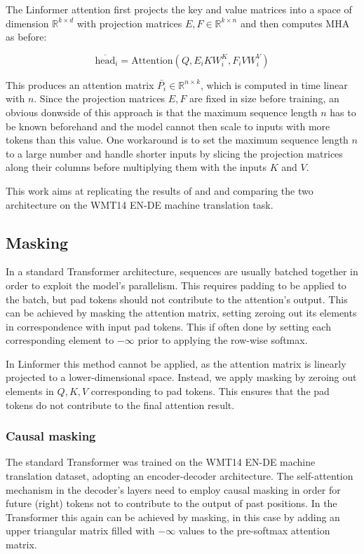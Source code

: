 \documentclass[titlepage]{article}
\begin{document}
The Linformer attention first projects the key and value matrices into a
space of dimension $\mathbb{R}^{k \times d}$ with projection matrices $E, F \in
\mathbb{R}^{k \times n}$ and then computes MHA as before:

\begin{equation}
  \overline{\textrm{head}}_i = \textrm{Attention}\left( Q, E_i K W_i^K, F_i V
  W_i^V \right)
\end{equation}

This produces an attention matrix $\bar{P_i} \in \mathbb{R}^{n \times k}$,
which is computed in time linear with $n$.
Since the projection matrices $E, F$ are fixed in size before training, an
obvious donwside of this approach is that the maximum sequence length $n$ has
to be known beforehand and the model cannot then scale to inputs with more
tokens than this value. One workaround is to set the maximum sequence length
$n$ to a large number and handle shorter inputs by slicing the projection
matrices along their columns before multiplying them with the inputs $K$ and
$V$.

This work aims at replicating the results of \cite{vaswani2017} and \cite{linformer2020} and comparing the two architecture on the WMT14 EN-DE machine translation task.

\subsection{Masking}
In a standard Transformer architecture, sequences are usually batched together
in order to exploit the model's parallelism. This requires padding to be
applied to the batch, but pad tokens should not contribute to the attention's
output. This can be achieved by masking the attention matrix, setting zeroing
out its elements in correspondence with input pad tokens. This if often done by
setting each corresponding element to $-\infty$ prior to applying the row-wise
softmax.

In Linformer this method cannot be applied, as the attention matrix is linearly projected to a lower-dimensional space. Instead, we apply masking by zeroing out elements in $Q, K, V$ corresponding to pad tokens. This ensures that the pad tokens do not contribute to the final attention result.
\subsubsection{Causal masking}
The standard Transformer was trained on the WMT14 EN-DE machine translation dataset, adopting an encoder-decoder architecture. The self-attention mechanism in the decoder's layers need to employ causal masking in order for future (right) tokens not to contribute to the output of past positions. In the Transformer this again can be achieved by masking, in this case by adding an upper triangular matrix filled with $-\infty$ values to the pre-softmax attention matrix.
\end{document}
